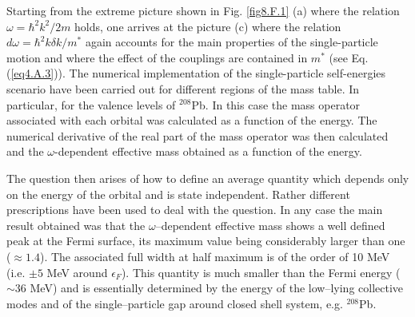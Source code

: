 Starting from the extreme picture shown in Fig. \ref{fig8.F.1} (a) where the relation $\omega=\hbar^2k^2/2m$ holds, one arrives at the picture (c) where the relation $d\omega=\hbar^2k\delta k/m^*$ again accounts for the main properties of the single-particle motion and where the effect of the couplings are contained in $m^*$ (see Eq. (\ref{eq4.A.3})). The numerical implementation of the single-particle self-energies scenario have been carried out for different regions of the mass table. In particular, for the valence levels of $^{208}$Pb. In this case the mass operator associated with each orbital was calculated as a function of the energy. The numerical derivative of the real part of the mass operator was then calculated and the $\omega$-dependent effective mass obtained as a function of the energy.


The question then arises of how to define an average quantity which depends only on the energy of the orbital and is state independent. Rather different prescriptions have been used to deal with the question. In any case the main result obtained was that the $\omega$--dependent effective mass shows a well defined peak at the Fermi surface, its maximum value being considerably larger than one ($\approx 1.4$). The associated full width at half maximum is of the order of 10 MeV (i.e. $\pm 5$ MeV around $\epsilon_F$). This quantity is much smaller than the Fermi energy ($\sim 36$ MeV) and is essentially determined by the energy of the low--lying collective modes and of the single--particle gap around closed shell system, e.g. $^{208}$Pb.









\renewcommand{\bibname}{Bibliography Ch 5}

%
 
